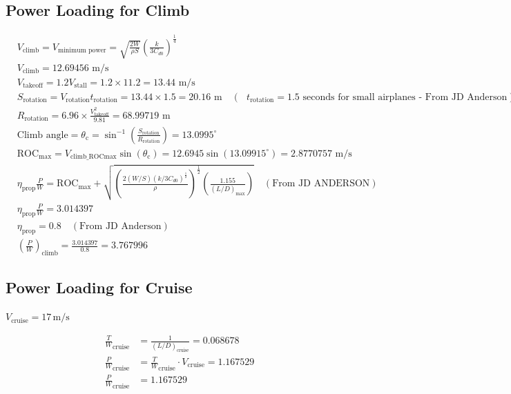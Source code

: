 \documentclass[12 pt]{article}
\begin{document}
\subsection {Power Loading for Climb}
\begin{align*}
& V_{\text{climb}} = V_{\text{minimum power}} = \sqrt{\frac{2W}{\rho S}} \left(\frac{k}{3C_{d0}}\right)^{\frac{1}{4}} \\
& V_{\text{climb}} = 12.69456 \text{ m/s} \\
& V_{\text{takeoff}} = 1.2 V_{\text{stall}} = 1.2 \times 11.2 = 13.44 \text{ m/s} \\
& S_{\text{rotation}} = V_{\text{rotation}} t_{\text{rotation}} = 13.44 \times 1.5 = 20.16 \text{ m} \quad (\text{ } t_{\text{rotation}} = 1.5 \text{ seconds for small airplanes - From JD Anderson}) \\
& R_{\text{rotation}} = 6.96 \times \frac{V_{\text{takeoff}}^2}{9.81} = 68.99719 \text{ m} \\
& \text{Climb angle} = \theta_{\text{c}} = \sin^{-1}\left(\frac{S_{\text{rotation}}}{R_{\text{rotation}}}\right) = 13.0995^\circ \\
& \text{ROC}_{\text{max}} = V_{\text{climb\_ROCmax}} \sin(\theta_{\text{c}}) = 12.6945 \sin(13.09915^\circ) = 2.8770757 \text{ m/s} \\
& \eta_{\text{prop}} \frac{P}{W} = \text{ROC}_{\text{max}} + \sqrt{\left(\frac{2(W/S) (k/3C_{d0})^{\frac{1}{2}}}{\rho}\right)^{\frac{1}{2}} \left(\frac{1.155}{(L/D)_{\text{max}}}\right)} \quad (\text{From JD ANDERSON}) \\
& \eta_{\text{prop}} \frac{P}{W} = 3.014397 \\
& \eta_{\text{prop}} = 0.8 \quad (\text{From JD Anderson}) \\
& \left(\frac{P}{W}\right)_{\text{climb}} = \frac{3.014397}{0.8} = 3.767996
\end{align*}
\subsection {Power Loading for Cruise}

\begin{center}
$V_{\text{cruise}} = 17 \, \text{m/s}$
\end{center}
\begin{align*}
\frac{T}{W}_{\text{cruise}} &= \frac{1}{(L/D)_{\text{cruise}}} = 0.068678 \\
\frac{P}{W}_{\text{cruise}} &= \frac{T}{W}_{\text{cruise}} \cdot V_{\text{cruise}} = 1.167529 \\
\frac{P}{W}_{\text{cruise}} &= 1.167529 \\
\end{align*}
\end{document}
